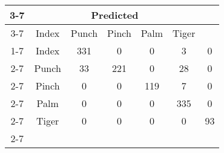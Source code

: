 \documentclass{standalone}
\begin{document}
 
 \begin{tabular}{|c |c |c |c |c |c |c |}
\cline{3-7}\multicolumn{2}{c|}{} & \multicolumn{5}{c|}{Predicted} \\ 
\cline{3-7} \multicolumn{2}{c |}{ } & Index & Punch & Pinch & Palm & Tiger\\ 
\cline{1-7}\multirow{5}{*}{\rotatebox[origin=c]{90}{Actual}} & Index & 331 & 0 & 0 & 3 & 0\\ 
 \cline{2-7} & Punch & 33 & 221 & 0 & 28 & 0\\ 
 \cline{2-7} & Pinch & 0 & 0 & 119 & 7 & 0\\ 
 \cline{2-7} & Palm & 0 & 0 & 0 & 335 & 0\\ 
 \cline{2-7} & Tiger & 0 & 0 & 0 & 0 & 93\\ 
 \cline{2-7}\hline \end{tabular}
 
\end{document}
